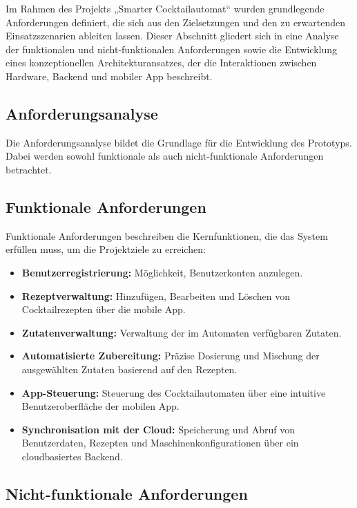Im Rahmen des Projekts „Smarter Cocktailautomat“ wurden grundlegende Anforderungen definiert, die 
sich aus den Zielsetzungen und den zu erwartenden Einsatzszenarien ableiten lassen. Dieser 
Abschnitt gliedert sich in eine Analyse der funktionalen und nicht-funktionalen Anforderungen 
sowie die Entwicklung eines konzeptionellen Architekturansatzes, der die Interaktionen zwischen 
Hardware, Backend und mobiler App beschreibt.

\subsection{Anforderungsanalyse}

Die Anforderungsanalyse bildet die Grundlage für die Entwicklung des Prototyps. Dabei werden 
sowohl funktionale als auch nicht-funktionale Anforderungen betrachtet.

\subsection{Funktionale Anforderungen}

Funktionale Anforderungen beschreiben die Kernfunktionen, die das System erfüllen muss, um die 
Projektziele zu erreichen:

\begin{itemize}
	  \item \textbf{Benutzerregistrierung:} Möglichkeit, Benutzerkonten anzulegen.
	  \item \textbf{Rezeptverwaltung:} Hinzufügen, Bearbeiten und Löschen von Cocktailrezepten über die mobile App.
	  \item \textbf{Zutatenverwaltung:} Verwaltung der im Automaten verfügbaren Zutaten.
	  \item \textbf{Automatisierte Zubereitung:} Präzise Dosierung und Mischung der ausgewählten Zutaten basierend auf den Rezepten.
	  \item \textbf{App-Steuerung:} Steuerung des Cocktailautomaten über eine intuitive Benutzeroberfläche der mobilen App.
	  \item \textbf{Synchronisation mit der Cloud:} Speicherung und Abruf von Benutzerdaten, Rezepten und Maschinenkonfigurationen über ein cloudbasiertes Backend.
\end{itemize}

\subsection{Nicht-funktionale Anforderungen}

